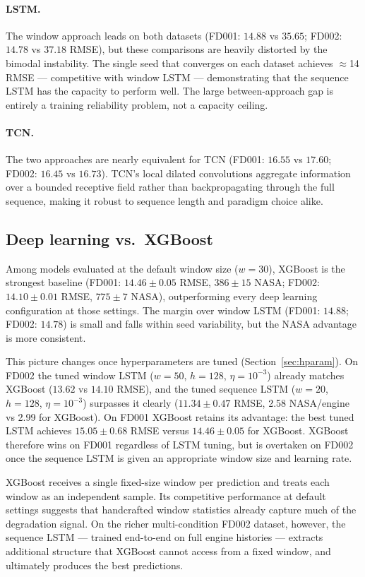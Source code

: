 \documentclass[a4paper,11pt]{article}
\begin{document}
\paragraph{LSTM.}
The window approach leads on both datasets (FD001: $14.88$ vs $35.65$; FD002: $14.78$ vs $37.18$ RMSE), but these comparisons are heavily distorted by the bimodal instability.
The single seed that converges on each dataset achieves $\approx$14 RMSE — competitive with window LSTM — demonstrating that the sequence LSTM has the capacity to perform well.
The large between-approach gap is entirely a training reliability problem, not a capacity ceiling.

\paragraph{TCN.}
The two approaches are nearly equivalent for TCN (FD001: $16.55$ vs $17.60$; FD002: $16.45$ vs $16.73$).
TCN's local dilated convolutions aggregate information over a bounded receptive field rather than backpropagating through the full sequence, making it robust to sequence length and paradigm choice alike.

\subsection{Deep learning vs.\ XGBoost}

Among models evaluated at the default window size ($w=30$), XGBoost is the strongest baseline (FD001: $14.46 \pm 0.05$ RMSE, $386 \pm 15$ NASA; FD002: $14.10 \pm 0.01$ RMSE, $775 \pm 7$ NASA), outperforming every deep learning configuration at those settings.
The margin over window LSTM (FD001: $14.88$; FD002: $14.78$) is small and falls within seed variability, but the NASA advantage is more consistent.

This picture changes once hyperparameters are tuned (Section~\ref{sec:hparam}).
On FD002 the tuned window LSTM ($w=50$, $h=128$, $\eta=10^{-3}$) already matches XGBoost ($13.62$ vs $14.10$ RMSE), and the tuned sequence LSTM ($w=20$, $h=128$, $\eta=10^{-3}$) surpasses it clearly ($11.34 \pm 0.47$ RMSE, 2.58 NASA/engine vs 2.99 for XGBoost).
On FD001 XGBoost retains its advantage: the best tuned LSTM achieves $15.05 \pm 0.68$ RMSE versus $14.46 \pm 0.05$ for XGBoost.
XGBoost therefore wins on FD001 regardless of LSTM tuning, but is overtaken on FD002 once the sequence LSTM is given an appropriate window size and learning rate.

XGBoost receives a single fixed-size window per prediction and treats each window as an independent sample.
Its competitive performance at default settings suggests that handcrafted window statistics already capture much of the degradation signal.
On the richer multi-condition FD002 dataset, however, the sequence LSTM — trained end-to-end on full engine histories — extracts additional structure that XGBoost cannot access from a fixed window, and ultimately produces the best predictions.
\end{document}
